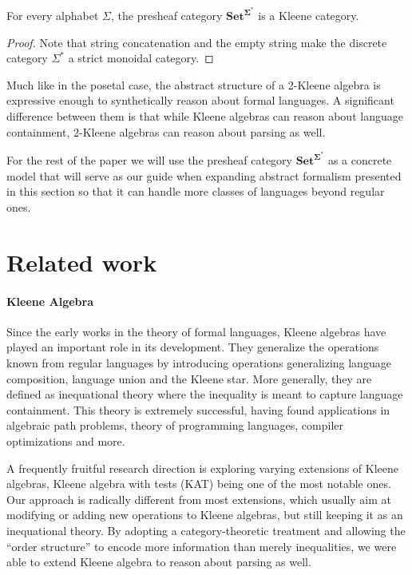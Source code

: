 \documentclass[sigconf,anonymous,review,screen]{acmart}
\newcommand{\cat}[1]{\mathbf{#1}}
\newcommand{\Set}{\mathbf{Set}}
\begin{document}
\begin{corollary}
  For every alphabet $\Sigma$, the presheaf category $\Set^{\cat{\Sigma^*}}$
  is a Kleene category.
\end{corollary}
\begin{proof}
  Note that string concatenation and the empty string make the
  discrete category $\Sigma^*$ a strict monoidal category.
\end{proof}

Much like in the posetal case, the abstract structure of a 2-Kleene
algebra is expressive enough to synthetically reason about formal
languages. A significant difference between them is that while Kleene
algebras can reason about language containment, 2-Kleene algebras can
reason about parsing as well.

For the rest of the paper we will use the presheaf category
$\Set^{\cat{\Sigma^*}}$ as a concrete model that will serve as our
guide when expanding abstract formalism presented in this section so
that it can handle more classes of languages beyond regular ones.

\section{Related work}

\paragraph{Kleene Algebra}

Since the early works in the theory of formal languages, Kleene
algebras have played an important role in its development. They
generalize the operations known from regular languages by introducing
operations generalizing language composition, language union and the
Kleene star.  More generally, they are defined as inequational theory
where the inequality is meant to capture language containment. This
theory is extremely successful, having found applications in algebraic
path problems, theory of programming languages, compiler optimizations
and more.

A frequently fruitful research direction is exploring varying
extensions of Kleene algebras, Kleene algebra with tests (KAT) being
one of the most notable ones. Our approach is radically different from
most extensions, which usually aim at modifying or adding new
operations to Kleene algebras, but still keeping it as an inequational
theory. By adopting a category-theoretic treatment and allowing the
``order structure'' to encode more information than merely
inequalities, we were able to extend Kleene algebra to reason about
parsing as well.
\end{document}
